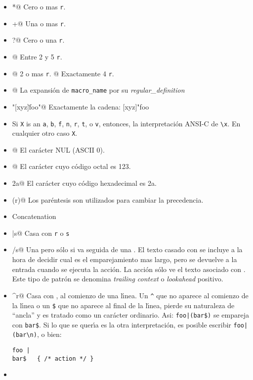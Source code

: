 \begin{itemize}
\item
\verb@r*@	Cero o mas \verb|r|.
\item
\verb@r+@       Una o mas \verb|r|.
\item
\verb@r?@	Cero o una  \verb|r|.
\item
{}@     Entre 2 y 5  \verb|r|.
\item
{}@      2 o mas \verb|r|. 
@	  Exactamente 4 \verb|r|. 
\item
{}@     La expansi\'on de \verb"macro_name" por su \emph{regular\_definition}
\item
\verb@"[xyz]\"foo"@ Exactamente la cadena: [xyz]"foo
\item
\verb@\X@	      Si \verb|X| is an \verb'a', \verb'b', \verb'f', \verb'n', \verb'r', \verb't', o \verb'v', entonces, la interpretaci\'on ANSI-C de \verb|\x|.  En cualquier otro caso \verb'X'.
\item
\verb@\0@	      El car\'acter NUL (ASCII 0).
\item
\verb@{}@	      El car\'acter cuyo c\'odigo octal es 123.
\item
\verb@\x2a@	      El car\'acter cuyo c\'odigo hexadecimal es 2a.
\item
\verb@(r)@	      Los par\'entesis son utilizados para cambiar la precedencia.
\item
\verb@rs@	      Concatenation
\item
\verb@r|s@	      Casa con  \verb|r| o \verb|s|
\item
\verb@r/s@	      Una \verb@r@ pero s\'olo si va seguida de una \verb@s@. El texto casado con \verb@s@ se incluye a la hora de decidir cual es el emparejamiento mas largo, pero se devuelve a la entrada cuando se ejecuta la acci\'on. La acci\'on s\'olo ve el texto asociado con \verb@r@. Este tipo de patr\'on se denomina \emph{trailing context} o \emph{lookahead} positivo.  
\item
\verb@^r@	      Casa con \verb@r@, al comienzo de una l\'{\i}nea.
                      Un \verb|^| que no aparece al comienzo de la l\'{\i}nea o un \verb|$| que no aparece al final de la l\'{\i}nea, pierde su naturaleza de ``ancla'' y es tratado como un car\'acter ordinario. Asi: \verb#foo|(bar$)# se empareja con \verb|bar$|. Si lo que se quer\'{\i}a es la otra interpretaci\'on, es posible escribir \verb#foo|(bar\n)#, o bien:
\begin{verbatim}
foo |
bar$   { /* action */ }
\end{verbatim}
\item

\end{itemize}

